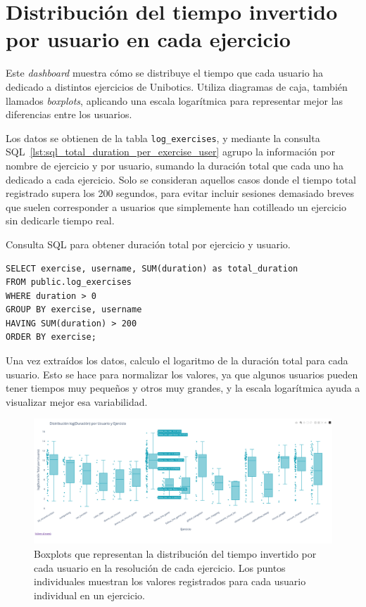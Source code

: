\documentclass[a4paper, 12pt]{book}
\begin{document}
\section{Distribución del tiempo invertido por usuario en cada ejercicio}
\label{sec:dash3b}

Este \textit{dashboard} muestra cómo se distribuye el tiempo que cada usuario ha dedicado a distintos ejercicios de Unibotics. Utiliza diagramas de caja, también llamados \textit{boxplots}, aplicando una escala logarítmica para representar mejor las diferencias entre los usuarios.

Los datos se obtienen de la tabla \texttt{log\_exercises}, y mediante la consulta SQL~\ref{lst:sql_total_duration_per_exercise_user} agrupo la información por nombre de ejercicio y por usuario, sumando la duración total que cada uno ha dedicado a cada ejercicio. Solo se consideran aquellos casos donde el tiempo total registrado supera los 200 segundos, para evitar incluir sesiones demasiado breves que suelen corresponder a usuarios que simplemente han cotilleado un ejercicio sin dedicarle tiempo real.

\begin{listing}[h!]
\caption{Consulta SQL para obtener duración total por ejercicio y usuario.}
\label{lst:sql_total_duration_per_exercise_user}
\begin{verbatim}
SELECT exercise, username, SUM(duration) as total_duration
FROM public.log_exercises
WHERE duration > 0
GROUP BY exercise, username
HAVING SUM(duration) > 200
ORDER BY exercise;
\end{verbatim}
\end{listing}

Una vez extraídos los datos, calculo el logaritmo de la duración total para cada usuario. Esto se hace para normalizar los valores, ya que algunos usuarios pueden tener tiempos muy pequeños y otros muy grandes, y la escala logarítmica ayuda a visualizar mejor esa variabilidad.


\begin{figure}[H]
  \centering
  \includegraphics[width=1.1\textwidth]{img/3bb.png}
  \caption{Boxplots que representan la distribución del tiempo invertido por cada usuario en la resolución de cada ejercicio. Los puntos individuales muestran los valores registrados para cada usuario individual en un ejercicio.}
  \label{fig:3b}
\end{figure}
\end{document}
